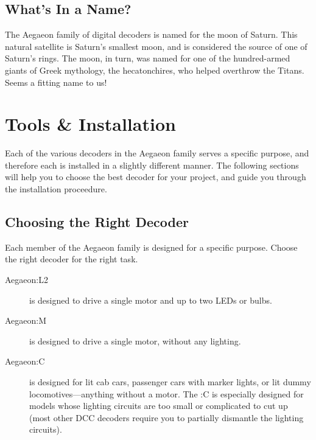 \documentclass[12pt,letterpaper,draft]{memoir} %
\begin{document}
\section{What's In a Name?}

The Aegaeon family of digital decoders is named for the moon of Saturn. This natural satellite is Saturn's smallest moon, and is considered the source of one of Saturn's rings. The moon, in turn, was named for one of the hundred-armed giants of Greek mythology, the hecatonchires, who helped overthrow the Titans. Seems a fitting name to us!

\chapter{Tools \& Installation}
\label{installation}
Each of the various decoders in the Aegaeon family serves a specific purpose, and therefore each is installed in a slightly different manner. The following sections will help you to choose the best decoder for your project, and guide you through the installation proceedure.

\section{Choosing the Right Decoder}

Each member of the Aegaeon family is designed for a specific purpose. Choose the right decoder for the right task.

\begin{description}
\item[Aegaeon:L2] is designed to drive a single motor and up to two LEDs or bulbs.
\item[Aegaeon:M] is designed to drive a single motor, without any lighting.
\item[Aegaeon:C] is designed for lit cab cars, passenger cars with marker lights, or lit dummy locomotives---anything without a motor. The :C is especially designed for models whose lighting circuits are too small or complicated to cut up (most other DCC decoders require you to partially dismantle the lighting circuits).
\end{description}
\end{document}
